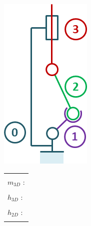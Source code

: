 \documentclass[10pt,fleqn]{article} %
\begin{document}
\begin{multicols}{2}
\begin{minipage}[c]{.45\linewidth}
\begin{center}
\includegraphics[width=.8\linewidth]{images/cas_05.png}
\end{center}
\end{minipage} \hfill
\begin{minipage}[c]{.5\linewidth}
\begin{center}
\begin{tabular}{|p{3cm}|}
\hline 
\\
$m_{3D}$ : \\
\\
$h_{3D}$ : \\
\\
$h_{2D}$ : \\
\\
\hline
\end{tabular}
\end{center}
\end{minipage}



\end{multicols}
\end{document}
